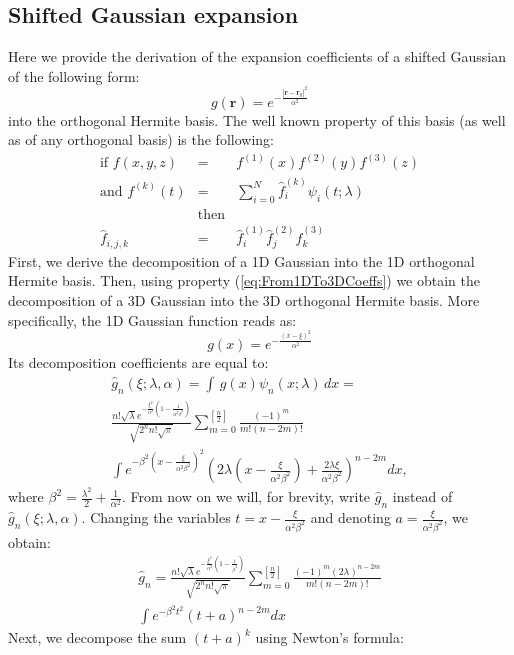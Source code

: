 \subsection{Shifted Gaussian expansion}
\label{Sec: Shifted Gaussian expansion}

Here we provide the derivation of the expansion coefficients of a
shifted Gaussian of the following form:
%
\begin{equation}
g(\mathbf{r})=e^{-\frac{|\mathbf{r}-\mathbf{r}_{0}|^{2}}{\alpha^{2}}}
\end{equation}
into the orthogonal Hermite basis. The well known property of this
basis (as well as of any orthogonal basis) is the following:
%
\begin{eqnarray}
\mbox{if }f(x,y,z) & = & f^{(1)}(x)f^{(2)}(y)f^{(3)}(z)\nonumber \\
\mbox{and }f^{(k)}(t) & = & \sum_{i=0}^{N}\hat{f}_{i}^{(k)}\psi_{i}(t;\lambda)\nonumber \\
 & \mbox{then}\nonumber \\
\hat{f}_{i,j,k} & = & \hat{f}_{i}^{(1)}\hat{f}_{j}^{(2)}\hat{f}_{k}^{(3)}\label{eq:From1DTo3DCoeffs}
\end{eqnarray}
First, we derive the decomposition of a 1D Gaussian into the 1D orthogonal
Hermite basis. Then, using property (\ref{eq:From1DTo3DCoeffs})
we obtain the decomposition of a 3D Gaussian into the 3D orthogonal
Hermite basis.
%
More specifically, the 1D Gaussian function reads as:
%
\begin{equation}
g(x)=e^{-\frac{(x-\xi)^{2}}{\alpha^{2}}}
\end{equation}
Its decomposition coefficients are equal to:
%
\begin{eqnarray}
\hat{g}_{n}(\xi;\lambda,\alpha) = \int\, g(x)\psi_{n}(x;\lambda)\, dx =  \nonumber \\ 
\frac{n!\sqrt{\lambda}e^{-\frac{\xi^{2}}{\alpha^{2}}\left(1-\frac{1}{\alpha^{2}\beta^{2}}\right)}}{\sqrt{2^{n}n!\sqrt{\pi}}} \sum_{m=0}^{[\frac{n}{2}]}\frac{(-1)^{m}}{m!(n-2m)!}  \nonumber \\ 
\int e^{-\beta^{2}\left(x-\frac{\xi}{\alpha^{2}\beta^{2}}\right)^{2}} (2\lambda(x-\frac{\xi}{\alpha^{2}\beta^{2}})+\frac{2\lambda\xi}{\alpha^{2}\beta^{2}})^{n-2m}dx   
,\end{eqnarray}
where $\beta^{2}=\frac{\lambda^{2}}{2}+\frac{1}{\alpha^{2}}$. From now on we will, for brevity, write $\hat{g}_{n}$ instead of
$\hat{g}_{n}(\xi;\lambda,\alpha)$. Changing the variables
$t=x-\frac{\xi}{\alpha^{2}\beta^{2}}$ and denoting $a=\frac{\xi}{\alpha^{2}\beta^{2}}$,
we obtain: 
%
\begin{eqnarray}
\hat{g}_{n} = \frac{n!\sqrt{\lambda}e^{-\frac{\xi^{2}}{\alpha^{2}}\left(1-\frac{1}{\beta^{2}}\right)}}{\sqrt{2^{n}n!\sqrt{\pi}}} \sum_{m=0}^{[\frac{n}{2}]}\frac{(-1)^{m}\left(2\lambda\right)^{n-2m}}{m!(n-2m)!} \nonumber \\ 
\int e^{-\beta^{2}t^{2}}(t+a)^{n-2m}dx\label{eq:gausCoeff}
\end{eqnarray}
Next, we decompose the sum $(t+a)^{k}$ using Newton's formula:
%

